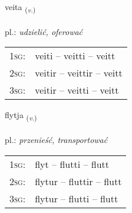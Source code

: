 \documentclass[frontgrid, backgrid]{flacards}\usepackage[]{graphicx}\usepackage[]{xcolor}
\begin{document}
\renewcommand{\blhead}{\vskip5pt {\small\bfseries\footnotesize Sagnorð | czasownik }}
\renewcommand{\bcfoot}{\vskip5pt \hspace{2pt}{\small\bfseries\footnotesize 1K}}


{veita \small{\textsubscript{(\textit{v.})}} \\[1ex] %
\textphonetic{[veiːta]} \\
pl.: \emph{udzielić, oferować} \\  [2ex]
\renewcommand*{\arraystretch}{0.8}
\begin{tabular}{p{1cm}l}
\textsc{1sg}: & veiti -- veitti -- veitt \\ 
\textsc{2sg}: & veitir -- veittir -- veitt \\ 
\textsc{3sg}: & veitir -- veitti -- veitt \\ 
\end{tabular}
}

\renewcommand{\flhead}{\vskip5pt \fboxsep=0pt {\small\bfseries\footnotesize Sagnorð | czasownik}}
\renewcommand{\fcfoot}{\vskip5pt \fboxsep=0pt \hspace{2pt}{\small\bfseries\footnotesize 1K}}

\renewcommand{\blhead}{\vskip5pt {\small\bfseries\footnotesize Sagnorð | czasownik }}
\renewcommand{\bcfoot}{\vskip5pt \hspace{2pt}{\small\bfseries\footnotesize 1K}}


{flytja \small{\textsubscript{(\textit{v.})}} \\[1ex] %
\textphonetic{[flɪːtja]} \\
pl.: \emph{przenieść, transportować} \\  [2ex]
\renewcommand*{\arraystretch}{0.8}
\begin{tabular}{p{1cm}l}
\textsc{1sg}: & flyt -- flutti -- flutt \\ 
\textsc{2sg}: & flytur -- fluttir -- flutt \\ 
\textsc{3sg}: & flytur -- flutti -- flutt \\ 
\end{tabular}
}
\end{document}
